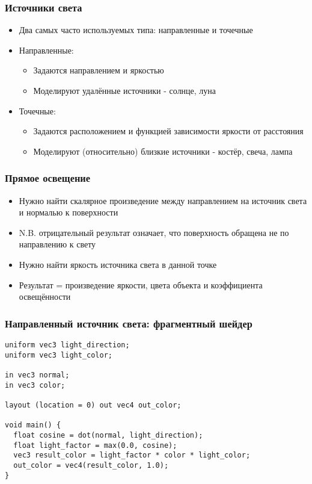 \documentclass{beamer}
\begin{document}
\begin{frame}[fragile]
\frametitle{Источники света}
\begin{itemize}
\item Два самых часто используемых типа: направленные и точечные
\pause
\item Направленные:
\begin{itemize}
\item Задаются направлением и яркостью
\item Моделируют удалённые источники - солнце, луна
\end{itemize}
\pause
\item Точечные:
\begin{itemize}
\item Задаются расположением и функцией зависимости яркости от расстояния
\item Моделируют (относительно) близкие источники - костёр, свеча, лампа
\end{itemize}
\end{itemize}
\end{frame}

\begin{frame}[fragile]
\frametitle{Прямое освещение}
\begin{itemize}
\item Нужно найти скалярное произведение между направлением на источник света и нормалью к поверхности
\pause
\item N.B. отрицательный результат означает, что поверхность обращена не по направлению к свету
\pause
\item Нужно найти яркость источника света в данной точке
\pause
\item Результат = произведение яркости, цвета объекта и коэффициента освещённости
\end{itemize}
\end{frame}

\begin{frame}[fragile]
\frametitle{Направленный источник света: фрагментный шейдер}
\begin{verbatim}
uniform vec3 light_direction;
uniform vec3 light_color;

in vec3 normal;
in vec3 color;

layout (location = 0) out vec4 out_color;

void main() {
  float cosine = dot(normal, light_direction);
  float light_factor = max(0.0, cosine);
  vec3 result_color = light_factor * color * light_color;
  out_color = vec4(result_color, 1.0);
}
\end{verbatim}
\end{frame}
\end{document}
